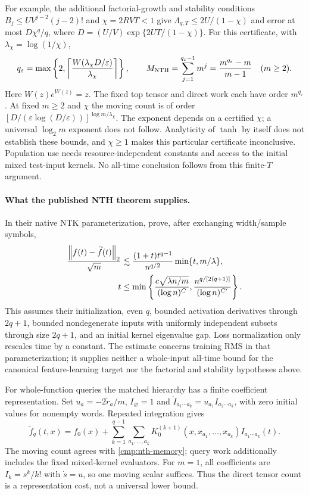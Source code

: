 For example, the additional factorial-growth and stability conditions
$B_j\le UV^{j-2}(j-2)!$ and $\chi=2RVT<1$ give
$\Lambda_{q,T}\le2U/(1-\chi)$ and error at most $D\chi^q/q$, where
$D=(U/V)\exp\{2UT/(1-\chi)\}$.  For this certificate, with
$\lambda_\chi=\log(1/\chi)$,
\begin{equation}
 q_\varepsilon=\max\left\{2,\left\lceil
 \frac{W(\lambda_\chi D/\varepsilon)}{\lambda_\chi}
 \right\rceil\right\},\qquad
 M_{\rm NTH}=\sum_{j=1}^{q_\varepsilon-1}m^j
 =\frac{m^{q_\varepsilon}-m}{m-1}\quad(m\ge2).
 \label{cmp:nth-memory}
\end{equation}
Here $W(z)e^{W(z)}=z$.  The fixed top tensor and direct work each have
order $m^{q_\varepsilon}$.  At fixed $m\ge2$ and $\chi$ the moving count
is of order
$[D/(\varepsilon\log(D/\varepsilon))]^{\log m/\lambda_\chi}$.
The exponent depends on a certified $\chi$; a universal $\log_2m$ exponent
does not follow.  Analyticity of $\tanh$ by itself does not establish these
bounds, and $\chi\ge1$ makes this particular certificate inconclusive.
Population use needs resource-independent constants and access to the
initial mixed test-input kernels.  No all-time conclusion follows from
this finite-$T$ argument.

\paragraph{What the published NTH theorem supplies.}
In their native NTK parameterization,
\citet[Theorem~2.6]{huang2020nth} prove, after exchanging width/sample symbols,
\begin{align}
 \frac{\left\lVert f(t)-\widetilde f(t)\right\rVert_2}{\sqrt m}
 &\lesssim\frac{(1+t)t^{q-1}}{n^{q/2}}\min\{t,m/\lambda\},\nonumber\\
 t&\le\min\left\{\frac{c\sqrt{\lambda n/m}}{(\log n)^C},
 \frac{n^{q/[2(q+1)]}}{(\log n)^{C'}}\right\}.
 \label{cmp:published-nth}
\end{align}
This assumes their initialization, even $q$, bounded activation derivatives
through $2q+1$, bounded nondegenerate inputs with uniformly independent
subsets through size $2q+1$, and an initial kernel eigenvalue gap.
Loss normalization only rescales time by a constant.  The estimate concerns
training RMS in that parameterization; it supplies neither a whole-input
all-time bound for the canonical feature-learning target nor the factorial
and stability hypotheses above.

For whole-function queries the matched hierarchy has a finite coefficient
representation.  Set $u_a=-2\widetilde r_a/m$, $I_\varnothing=1$ and
$\dot I_{a_1\cdots a_k}=u_{a_1}I_{a_2\cdots a_k}$, with zero initial
values for nonempty words.  Repeated integration gives
\begin{equation}
 \widetilde f_q(t,x)=f_0(x)+\sum_{k=1}^{q-1}\sum_{a_1,\ldots,a_k}
 K_0^{(k+1)}(x,x_{a_1},\ldots,x_{a_k})I_{a_1\cdots a_k}(t).
 \label{cmp:signature}
\end{equation}
The moving count agrees with \eqref{cmp:nth-memory}; query work additionally
includes the fixed mixed-kernel evaluators.  For $m=1$, all coefficients
are $I_k=s^k/k!$ with $\dot s=u$, so one moving scalar suffices.  Thus the
direct tensor count is a representation cost, not a universal lower bound.

